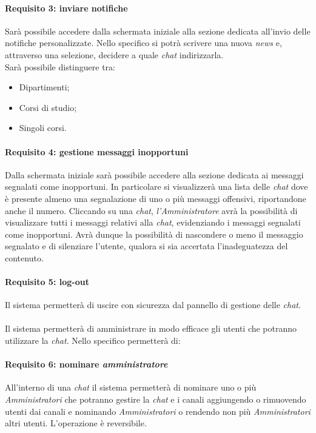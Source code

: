 \paragraph{Requisito 3: inviare notifiche\\} 
Sarà possibile accedere dalla schermata iniziale alla sezione dedicata all’invio delle notifiche personalizzate. Nello specifico si potrà scrivere una nuova \emph{news} e, attraverso una selezione, decidere a quale \emph{chat} indirizzarla.\\
Sarà possibile distinguere tra: 
\begin{itemize}
\item Dipartimenti;
\item Corsi di studio;
\item Singoli corsi. 
\end{itemize}
 
\paragraph{Requisito 4: gestione messaggi inopportuni\\}
Dalla schermata iniziale sarà possibile accedere alla sezione dedicata ai messaggi segnalati come inopportuni.
In particolare si visualizzerà una lista delle \emph{chat} dove è presente almeno una segnalazione di uno o più messaggi offensivi, riportandone anche il numero. Cliccando su una \emph{chat}, \emph{l’Amministratore} avrà la possibilità di visualizzare tutti i messaggi relativi alla \emph{chat}, evidenziando i messaggi segnalati come inopportuni. Avrà dunque la possibilità di nascondere o meno il messaggio segnalato e di silenziare l’utente, qualora si sia accertata l’inadeguatezza del contenuto.

\paragraph{Requisito 5: log-out\\}
Il sistema permetterà di uscire con sicurezza dal pannello di gestione delle \emph{chat}.\\
\\
Il sistema permetterà di amministrare in modo efficace gli utenti che potranno utilizzare la \emph{chat}. Nello specifico permetterà di:

\paragraph{Requisito 6: nominare \emph{amministratore}\\}
All’interno di una \emph{chat} il sistema permetterà di nominare uno o più \emph{Amministratori} che potranno gestire la \emph{chat} e i canali aggiungendo o rimuovendo utenti dai canali e nominando \emph{Amministratori} o rendendo non più \emph{Amministratori} altri utenti. L’operazione è reversibile.

